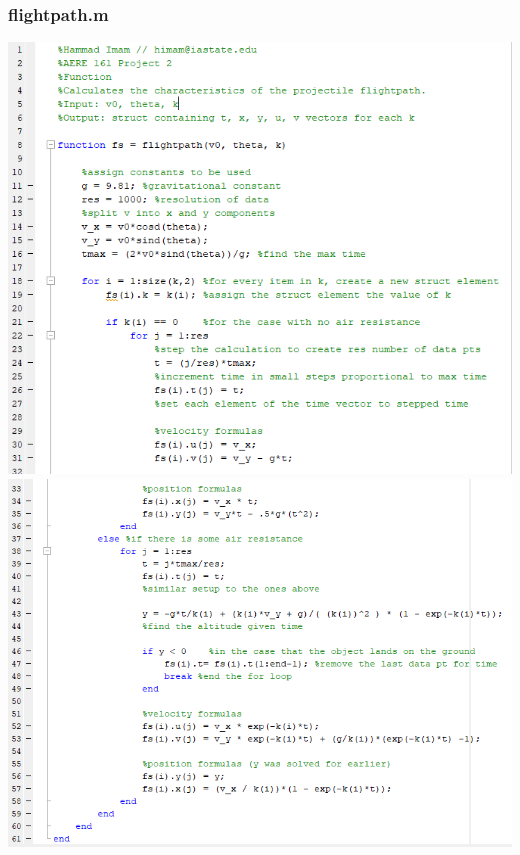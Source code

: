 \documentclass{article}
\begin{document}
\subsubsection{flightpath.m}
\includegraphics [width=\linewidth]{code_flightpath1.png}
\includegraphics [width=\linewidth]{code_flightpath2.png}
\end{document}
